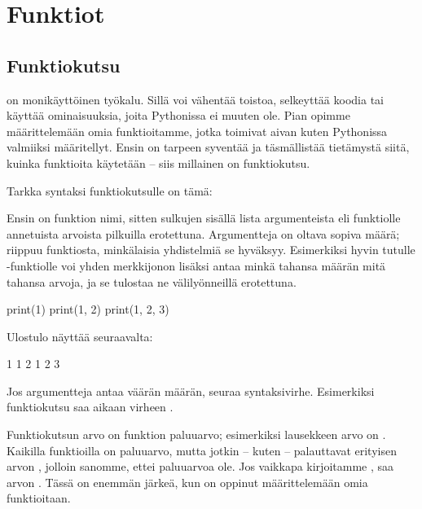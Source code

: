 \chapter{Funktiot}

\section{Funktiokutsu}

 on monikäyttöinen työkalu. Sillä voi vähentää toistoa, selkeyttää koodia tai käyttää ominaisuuksia, joita Pythonissa ei muuten ole. Pian opimme määrittelemään omia funktioitamme, jotka toimivat aivan kuten Pythonissa valmiiksi määritellyt. Ensin on tarpeen syventää ja täsmällistää tietämystä siitä, kuinka funktioita käytetään -- siis millainen on \gls{funktiokutsu}.

Tarkka syntaksi funktiokutsulle on tämä:


Ensin on funktion nimi, sitten sulkujen sisällä lista argumenteista eli funktiolle annetuista arvoista pilkuilla erotettuna. Argumentteja on oltava sopiva määrä; riippuu funktiosta, minkälaisia yhdistelmiä se hyväksyy. Esimerkiksi hyvin tutulle -funktiolle voi yhden merkkijonon lisäksi antaa minkä tahansa määrän mitä tahansa arvoja, ja se tulostaa ne välilyönneillä erotettuna.

\begin{python}
print(1)
print(1, 2)
print(1, 2, 3)
\end{python}

Ulostulo näyttää seuraavalta:

\begin{output}
1
1 2
1 2 3
\end{output}

Jos argumentteja antaa väärän määrän, seuraa syntaksivirhe. Esimerkiksi funktiokutsu  saa aikaan virheen .

Funktiokutsun arvo on funktion paluuarvo; esimerkiksi lausekkeen  arvo on . Kaikilla funktioilla on paluuarvo, mutta jotkin -- kuten  -- palauttavat erityisen arvon , jolloin sanomme, ettei paluuarvoa ole. Jos vaikkapa kirjoitamme ,  saa arvon . Tässä on enemmän järkeä, kun on oppinut määrittelemään omia funktioitaan.

